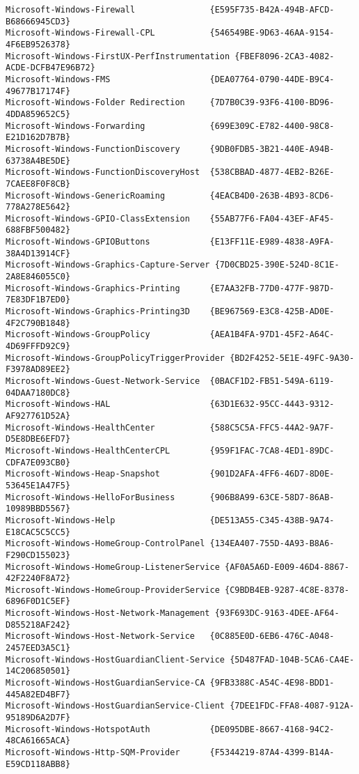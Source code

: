 \documentclass{report}
\begin{document}
\begin{lstlisting}[breaklines=true,basicstyle=\tiny]
Microsoft-Windows-Firewall               {E595F735-B42A-494B-AFCD-B68666945CD3}
Microsoft-Windows-Firewall-CPL           {546549BE-9D63-46AA-9154-4F6EB9526378}
Microsoft-Windows-FirstUX-PerfInstrumentation {FBEF8096-2CA3-4082-ACDE-DCFB47E96B72}
Microsoft-Windows-FMS                    {DEA07764-0790-44DE-B9C4-49677B17174F}
Microsoft-Windows-Folder Redirection     {7D7B0C39-93F6-4100-BD96-4DDA859652C5}
Microsoft-Windows-Forwarding             {699E309C-E782-4400-98C8-E21D162D7B7B}
Microsoft-Windows-FunctionDiscovery      {9DB0FDB5-3B21-440E-A94B-63738A4BE5DE}
Microsoft-Windows-FunctionDiscoveryHost  {538CBBAD-4877-4EB2-B26E-7CAEE8F0F8CB}
Microsoft-Windows-GenericRoaming         {4EACB4D0-263B-4B93-8CD6-778A278E5642}
Microsoft-Windows-GPIO-ClassExtension    {55AB77F6-FA04-43EF-AF45-688FBF500482}
Microsoft-Windows-GPIOButtons            {E13FF11E-E989-4838-A9FA-38A4D13914CF}
Microsoft-Windows-Graphics-Capture-Server {7D0CBD25-390E-524D-8C1E-2A8E846055C0}
Microsoft-Windows-Graphics-Printing      {E7AA32FB-77D0-477F-987D-7E83DF1B7ED0}
Microsoft-Windows-Graphics-Printing3D    {BE967569-E3C8-425B-AD0E-4F2C790B1848}
Microsoft-Windows-GroupPolicy            {AEA1B4FA-97D1-45F2-A64C-4D69FFFD92C9}
Microsoft-Windows-GroupPolicyTriggerProvider {BD2F4252-5E1E-49FC-9A30-F3978AD89EE2}
Microsoft-Windows-Guest-Network-Service  {0BACF1D2-FB51-549A-6119-04DAA7180DC8}
Microsoft-Windows-HAL                    {63D1E632-95CC-4443-9312-AF927761D52A}
Microsoft-Windows-HealthCenter           {588C5C5A-FFC5-44A2-9A7F-D5E8DBE6EFD7}
Microsoft-Windows-HealthCenterCPL        {959F1FAC-7CA8-4ED1-89DC-CDFA7E093CB0}
Microsoft-Windows-Heap-Snapshot          {901D2AFA-4FF6-46D7-8D0E-53645E1A47F5}
Microsoft-Windows-HelloForBusiness       {906B8A99-63CE-58D7-86AB-10989BBD5567}
Microsoft-Windows-Help                   {DE513A55-C345-438B-9A74-E18CAC5C5CC5}
Microsoft-Windows-HomeGroup-ControlPanel {134EA407-755D-4A93-B8A6-F290CD155023}
Microsoft-Windows-HomeGroup-ListenerService {AF0A5A6D-E009-46D4-8867-42F2240F8A72}
Microsoft-Windows-HomeGroup-ProviderService {C9BDB4EB-9287-4C8E-8378-6896F0D1C5EF}
Microsoft-Windows-Host-Network-Management {93F693DC-9163-4DEE-AF64-D855218AF242}
Microsoft-Windows-Host-Network-Service   {0C885E0D-6EB6-476C-A048-2457EED3A5C1}
Microsoft-Windows-HostGuardianClient-Service {5D487FAD-104B-5CA6-CA4E-14C206850501}
Microsoft-Windows-HostGuardianService-CA {9FB3388C-A54C-4E98-BDD1-445A82ED4BF7}
Microsoft-Windows-HostGuardianService-Client {7DEE1FDC-FFA8-4087-912A-95189D6A2D7F}
Microsoft-Windows-HotspotAuth            {DE095DBE-8667-4168-94C2-48CA61665ACA}
Microsoft-Windows-Http-SQM-Provider      {F5344219-87A4-4399-B14A-E59CD118ABB8}

\end{lstlisting}
\end{document}
